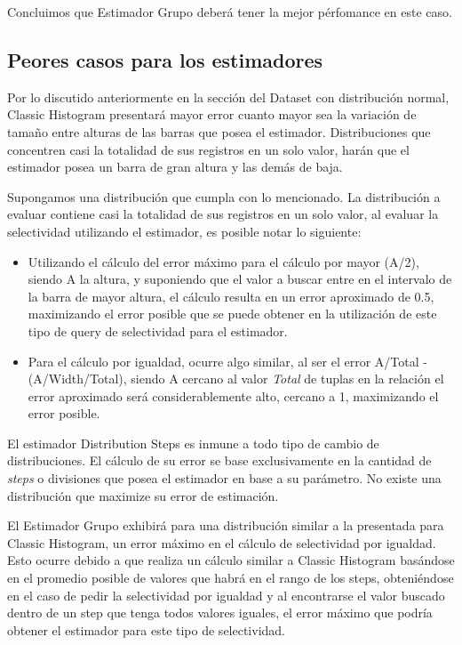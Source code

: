 \documentclass[a4paper, 10pt, twoside]{article}
\begin{document}
Concluimos que Estimador Grupo deberá tener la mejor pérfomance en este caso.

\subsection{Peores casos para los estimadores}

Por lo discutido anteriormente en la sección del Dataset con distribución normal, Classic Histogram presentará mayor error cuanto mayor sea la variación de tamaño entre alturas de las barras que posea el estimador. Distribuciones que concentren casi la totalidad de sus registros en un solo valor, harán que el estimador posea un barra de gran altura y las demás de baja.

Supongamos una distribución que cumpla con lo mencionado. La distribución a evaluar contiene casi la totalidad de sus registros en un solo valor, al evaluar la selectividad utilizando el estimador, es posible notar lo siguiente:
\begin{itemize}
\item Utilizando el cálculo del error máximo para el cálculo por mayor (A/2), siendo A la altura, y suponiendo que el valor a buscar entre en el intervalo de la barra de mayor altura, el cálculo resulta en un error aproximado de 0.5, maximizando el error posible que se puede obtener en la utilización de este tipo de query de selectividad para el estimador.
\item Para el cálculo por igualdad, ocurre algo similar, al ser el error A/Total - (A/Width/Total), siendo A cercano al valor \textit{Total} de tuplas en la relación el error aproximado será considerablemente alto, cercano a 1, maximizando el error posible.
\end{itemize}

El estimador Distribution Steps es inmune a todo tipo de cambio de distribuciones. El cálculo de su error se base exclusivamente en la cantidad de \textit{steps} o divisiones que posea el estimador en base a su parámetro. No existe una distribución que maximize su error de estimación.

El Estimador Grupo exhibirá para una distribución similar a la presentada para Classic Histogram, un error máximo en el cálculo de selectividad por igualdad. Esto ocurre debido a que realiza un cálculo similar a Classic Histogram basándose en el promedio posible de valores que habrá en el rango de los steps, obteniéndose en el caso de pedir la selectividad por igualdad y al encontrarse el valor buscado dentro de un step que tenga todos valores iguales, el error máximo que podría obtener el estimador para este tipo de selectividad. 
\end{document}

